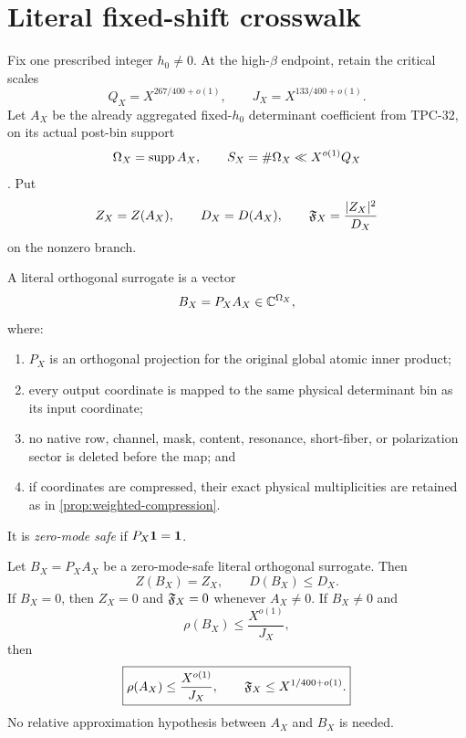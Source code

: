 \section{Literal fixed-shift crosswalk}
\label{sec:literal-crosswalk}

Fix one prescribed integer \(h_0\ne0\).  At the high-\(\beta\)
endpoint, retain the critical scales
\begin{equation}
 Q_X=X^{267/400+o(1)},\qquad
 J_X=X^{133/400+o(1)}.
\label{eq:critical-scales}
\end{equation}
Let \(A_X\) be the already aggregated fixed-\(h_0\) determinant
coefficient from TPC-32, on its actual post-bin support
\[
 \Omega_X=\operatorname{supp} A_X,\qquad
 S_X=\#\Omega_X\ll X^{o(1)}Q_X
\]
\citep{WangTPC32}.  Put
\[
 Z_X=Z(A_X),\qquad
 D_X=D(A_X),\qquad
 \mathfrak F_X=\frac{|Z_X|^2}{D_X}
\]
on the nonzero branch.

\begin{definition}
\label{def:literal-orthogonal-surrogate}
A literal orthogonal surrogate is a vector
\[
 B_X=P_XA_X\in\mathbb C^{\Omega_X},
\]
where:
\begin{enumerate}[label=(\roman*),leftmargin=2.2em]
\item \(P_X\) is an orthogonal projection for the original global
  atomic inner product;
\item every output coordinate is mapped to the same physical
  determinant bin as its input coordinate;
\item no native row, channel, mask, content, resonance, short-fiber,
  or polarization sector is deleted before the map; and
\item if coordinates are compressed, their exact physical
  multiplicities are retained as in
  \cref{prop:weighted-compression}.
\end{enumerate}
It is \emph{zero-mode safe} if \(P_X\mathbf 1=\mathbf 1\).
\end{definition}

\begin{theorem}
\label{thm:literal-safe-certificate}
Let \(B_X=P_XA_X\) be a zero-mode-safe literal orthogonal surrogate.
Then
\begin{equation}
 Z(B_X)=Z_X,\qquad
 D(B_X)\le D_X.
\label{eq:literal-dominance}
\end{equation}
If \(B_X=0\), then \(Z_X=0\) and \(\mathfrak F_X=0\) whenever
\(A_X\ne0\).  If \(B_X\ne0\) and
\begin{equation}
 \rho(B_X)
 \le\frac{X^{o(1)}}{J_X},
\label{eq:projected-angle-target}
\end{equation}
then
\begin{equation}
 \boxed{
 \rho(A_X)
 \le\frac{X^{o(1)}}{J_X},
 \qquad
 \mathfrak F_X
 \le X^{1/400+o(1)}.}
\label{eq:literal-flatness-target}
\end{equation}
No relative approximation hypothesis between \(A_X\) and \(B_X\)
is needed.
\end{theorem}

